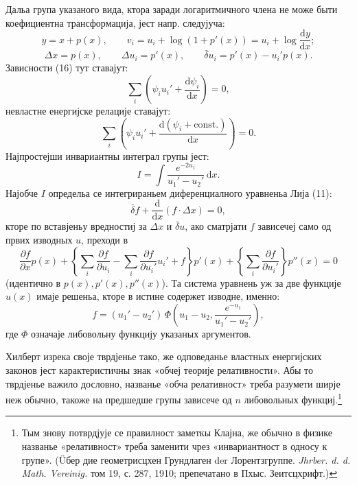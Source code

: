 ﻿\documentclass[11pt]{article}
\providecommand{\D}{\Delta}
\providecommand{\p}{\partial}
\providecommand{\dd}{\mathrm d}
\providecommand{\bd}{\bar{\delta}}
\providecommand{\lg}{\log}
\begin{document}
Дальа група указаного вида, ктора заради логаритмичного члена не може быти коефициентна трансформација, јест напр. следујуча:
\[
y=x+p(x),\qquad
v_i=u_i+\lg(1+p'(x))=u_i+\lg\frac{\dd y}{\dd x};
\]
\[
\D x=p(x),\qquad
\D u_i=p'(x),\qquad
\bd u_i=p'(x)-u_i'p(x).
\]
Зависности (16) тут ставајут:
\[
\sum_i\left(\psi_i u_i'+\frac{\dd\psi_i}{\dd x}\right)=0,
\]
невластне енергијске релације ставајут:
\[
\sum_i\left(\psi_i u_i'+
\frac{\dd(\psi_i+\mathrm{const.})}{\dd x}\right)=0.
\]
Најпростејши инвариантны интеграл групы јест:
\[
I=\int \frac{e^{-2u_1}}{u_1'-u_2'}\,\dd x.
\]
Најобче \(I\) определьа се интегрираньем диференциалного уравненьа Лија (11):
\[
\bd f+\frac{\dd}{\dd x}(f\cdot \D x)=0,
\]
кторе по вставјеньу вредностиј за \(\D x\) и \(\bd u\), ако сматрјати \(f\) зависечеј само од првих изводных \(u\), преходи в
\[
\frac{\p f}{\p x}p(x)
+\left\{\sum_i\frac{\p f}{\p u_i}
-\sum_i\frac{\p f}{\p u_i'}u_i'+f\right\}p'(x)
+\left\{\sum_i\frac{\p f}{\p u_i'}\right\}p''(x)=0
\]
(идентично в \(p(x),p'(x),p''(x)\)). Та система уравнень уж за две функције \(u(x)\) имаје решеньа, кторе в истине содержет изводне, именно:
\[
f=(u_1'-u_2')\,
\Phi\!\left(u_1-u_2,\frac{e^{-u_1}}{u_1'-u_2'}\right),
\]
где \(\Phi\) означаје либовольну функцију указаных аргументов.

Хилберт изрека своје тврдјенье тако, же одповеданье властных енергијских законов јест карактеристичны знак «обчеј теорије релативности». Абы то тврдјенье важило дословно, названье «обча релативност» треба разумети ширје неж обычно, такоже на предшедше групы зависече од \(n\) либовольных функциј.\footnote{Тым знову потврдјује се правилност заметкы Клајна, же обычно в физике названье «релативност» треба заменити чрез «инвариантност в односу к групе». (Üбер дие геометрисцхен Грундлаген der Лорентзгруппе. \emph{Jhrber. d. d. Math. Vereinig.} том 19, с. 287, 1910; препечатано в Пхыс. Зеитсцхрифт.)}
\end{document}
